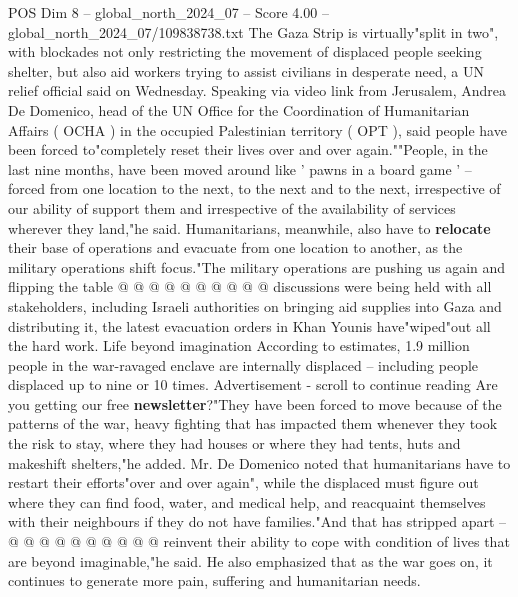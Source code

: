 \begin{textsample}{POS Dim 8 – global\_north\_2024\_07 – Score 4.00 – global\_north\_2024\_07/109838738.txt}  \label{ex:f8_pos_265}
The Gaza Strip is virtually"split in two", with blockades not only restricting the movement of displaced people seeking shelter, but also aid workers trying to assist civilians in desperate need, a UN relief official said on Wednesday.
Speaking via video link from Jerusalem, Andrea De Domenico, head of the UN Office for the Coordination of Humanitarian Affairs ( OCHA ) in the occupied Palestinian territory ( OPT ), said people have been forced to"completely reset their lives over and over again.""People, in the last nine months, have been moved around like ' pawns in a board game ' -- forced from one location to the next, to the next and to the next, irrespective of our ability of support them and irrespective of the availability of services wherever they land,"he said.
Humanitarians, meanwhile, also have to \textbf{relocate} their base of operations and evacuate from one location to another, as the military operations shift focus."The military operations are pushing us again and flipping the table @ @ @ @ @ @ @ @ @ @ discussions were being held with all stakeholders, including Israeli authorities on bringing aid supplies into Gaza and distributing it, the latest evacuation orders in Khan Younis have"wiped"out all the hard work.
Life beyond imagination According to estimates, 1.9 million people in the war-ravaged enclave are internally displaced -- including people displaced up to nine or 10 times.
Advertisement - scroll to continue reading Are you getting our free \textbf{newsletter}?"They have been forced to move because of the patterns of the war, heavy fighting that has impacted them whenever they took the risk to stay, where they had houses or where they had tents, huts and makeshift shelters,"he added.
Mr.
De Domenico noted that humanitarians have to restart their efforts"over and over again", while the displaced must figure out where they can find food, water, and medical help, and reacquaint themselves with their neighbours if they do not have families."And that has stripped apart -- @ @ @ @ @ @ @ @ @ @ reinvent their ability to cope with condition of lives that are beyond imaginable,"he said.
He also emphasized that as the war goes on, it continues to generate more pain, suffering and humanitarian needs.

\end{textsample}
